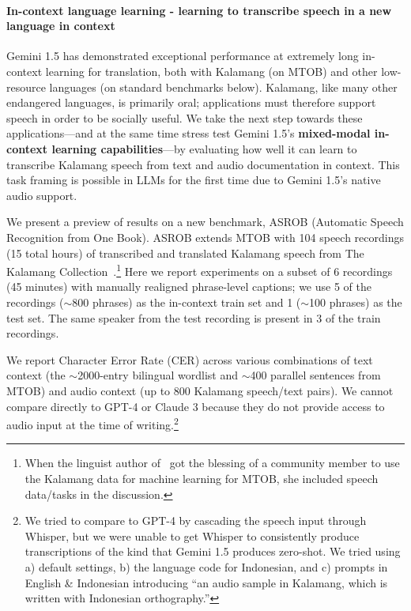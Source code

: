 \paragraph{In-context language learning - learning to transcribe speech in a new language in context}

Gemini 1.5 has demonstrated exceptional performance at extremely long in-context learning for translation, both with Kalamang (on MTOB) and other low-resource languages (on standard benchmarks below). Kalamang, like many other endangered languages, is primarily oral; applications must therefore support speech in order to be socially useful. We take the next step towards these applications---and at the same time stress test Gemini 1.5’s \textbf{mixed-modal in-context learning capabilities}---by evaluating how well it can learn to transcribe Kalamang speech from text and audio documentation in context. This task framing is possible in LLMs for the first time due to Gemini 1.5’s native audio support.

We present a preview of results on a new benchmark, ASROB (Automatic Speech Recognition from One Book). ASROB extends MTOB with 104 speech recordings (15 total hours) of transcribed and translated Kalamang speech from The Kalamang Collection~\citep{visser2021kalamangcorpus}.\footnote{When the linguist author of~\citet{visser2020grammar} got the blessing of a community member to use the Kalamang data for machine learning for MTOB, she included speech data/tasks in the discussion.} Here we report experiments on a subset of 6 recordings (45 minutes) with manually realigned phrase-level captions; we use 5 of the recordings ($\sim$800 phrases) as the in-context train set and 1 ($\sim$100 phrases) as the test set. The same speaker from the test recording is present in 3 of the train recordings.

We report Character Error Rate (CER) across various combinations of text context (the $\sim$2000-entry bilingual wordlist and $\sim$400 parallel sentences from MTOB) and audio context (up to 800 Kalamang speech/text pairs). We cannot compare directly to GPT-4 or Claude 3 because they do not provide access to audio input at the time of writing.\footnote{We tried to compare to GPT-4 by cascading the speech input through Whisper, but we were unable to get Whisper to consistently produce transcriptions of the kind that Gemini 1.5 produces zero-shot. We tried using a) default settings, b) the language code for Indonesian, and c) prompts in English \& Indonesian introducing ``an audio sample in Kalamang, which is written with Indonesian orthography.''}

